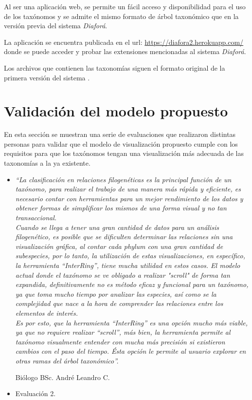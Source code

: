\documentclass[journal]{IEEEtran}
\begin{document}
Al ser una aplicación web, se permite un fácil acceso y disponibilidad para el uso de los taxónomos y se admite el 
mismo formato de árbol taxonómico que en la versión previa del sistema \emph{Diaforá}.

La aplicación se encuentra publicada en el url: \url{https://diafora2.herokuapp.com/} donde se puede acceder y probar las extensiones
mencionadas al sistema \emph{Diaforá}.

Los archivos que contienen las taxonomías siguen el formato original de la primera versión del sistema \cite{sancho_diafora}. \\


\section{Validación del modelo propuesto}
En esta sección se muestran una serie de evaluaciones que realizaron distintas personas para validar que el modelo de 
visualización propuesto cumple con los requisitos para que los taxónomos 
tengan una visualización más adecuada de las taxonomías a la ya existente.
\newline
\begin{itemize}
  \item \textit{“La clasificación en relaciones filogenéticas es la principal función de un taxónomo, para realizar el trabajo de una manera más rápida y eficiente, es necesario contar con herramientas para un mejor rendimiento de los datos y obtener formas de simplificar los mismos de una forma visual y no tan transaccional. \\
  Cuando se llega a tener una gran cantidad de datos para un análisis filogenético, es posible que se dificulten determinar las relaciones sin una visualización gráfica, al contar cada phylum con una gran cantidad de subespecies, por lo tanto, la utilización de estas visualizaciones, en específico, la herramienta “InterRing”, tiene mucha utilidad en estos casos. El modelo actual donde el taxónomo se ve obligado a realizar "scroll" de forma tan expandida, definitivamente no es método eficaz y funcional para un taxónomo, ya que toma mucho tiempo por analizar las especies, así como se la complejidad que nace a la hora de comprender las relaciones entre los elementos de interés. \\
  Es por esto, que la herramienta “InterRing” es una opción mucho más viable, ya que no requiere realizar “scroll”, más bien, la herramienta permite al taxónomo visualmente entender con mucha más precisión si existieron cambios con el paso del tiempo. Ésta opción le permite al usuario explorar en otras ramas del árbol taxonómico”.}
  
Biólogo BSc. André Leandro C. \\

  \item Evaluación 2.\\
\end{itemize}
\end{document}
